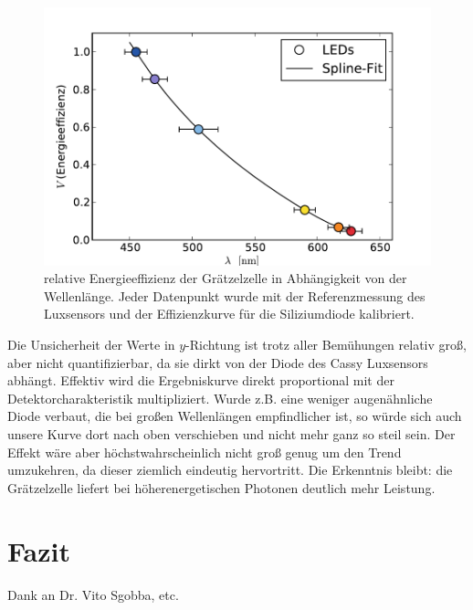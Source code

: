 \documentclass[11pt]{scrartcl}
\begin{document}
\begin{figure}[ht]
\begin{center}
\includegraphics[width=1.0\textwidth]{images/graetzel_lambda_korrigiert.pdf}
\end{center}
\vspace{-1.5\baselineskip}
\caption{relative Energieeffizienz der Grätzelzelle in Abhängigkeit von der Wellenlänge. Jeder Datenpunkt wurde mit der Referenzmessung des Luxsensors und der Effizienzkurve für die Siliziumdiode kalibriert.}
\label{lambda_korrigiert}
\end{figure}

Die Unsicherheit der Werte in $y$-Richtung ist trotz aller Bemühungen relativ groß, aber nicht quantifizierbar, da sie dirkt von der Diode des Cassy Luxsensors abhängt. Effektiv wird die Ergebniskurve direkt proportional mit der Detektorcharakteristik multipliziert. Wurde z.B. eine weniger augenähnliche Diode verbaut, die bei großen Wellenlängen empfindlicher ist, so würde sich auch unsere Kurve dort nach oben verschieben und nicht mehr ganz so steil sein. Der Effekt wäre aber höchstwahrscheinlich nicht groß genug um den Trend umzukehren, da dieser ziemlich eindeutig hervortritt. Die Erkenntnis bleibt: die Grätzelzelle liefert bei höherenergetischen Photonen deutlich mehr Leistung.


\section{Fazit}
Dank an Dr. Vito Sgobba, etc.
\end{document}
